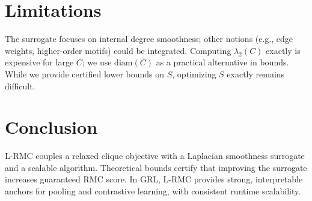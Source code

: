 \documentclass{article} %
\theoremstyle{remark}
\newcommand{\diam}{\mathrm{diam}}
\begin{document}
\section{Limitations}
The surrogate focuses on internal degree smoothness; other notions (e.g., edge weights, higher-order motifs) could be integrated. Computing \(\lambda_2(C)\) exactly is expensive for large \(C\); we use \(\diam(C)\) as a practical alternative in bounds. While we provide certified lower bounds on \(S\), optimizing \(S\) exactly remains difficult.

\section{Conclusion}
L-RMC couples a relaxed clique objective with a Laplacian smoothness surrogate and a scalable algorithm. Theoretical bounds certify that improving the surrogate increases guaranteed RMC score. In GRL, L-RMC provides strong, interpretable anchors for pooling and contrastive learning, with consistent runtime scalability.



\end{document}
